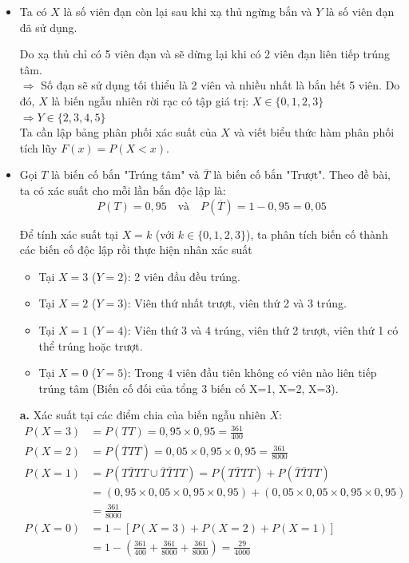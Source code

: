 \documentclass[12pt]{article}
\begin{document}
\begin{itemize}
    \item Ta có $X$ là số viên đạn còn lại sau khi xạ thủ ngừng bắn và $Y$ là số viên đạn đã sử dụng.
    
    Do xạ thủ chỉ có 5 viên đạn và sẽ dừng lại khi có 2 viên đạn liên tiếp trúng tâm.\\
    $\Rightarrow$ Số đạn sẽ sử dụng tối thiểu là 2 viên và nhiều nhất là bắn hết 5 viên. Do đó, $X$ là biến ngẫu nhiên rời rạc có tập giá trị: $X \in \{0, 1, 2, 3\}$ $\Rightarrow Y \in \{2, 3, 4, 5\}$ \\

    Ta cần lập bảng phân phối xác suất của $X$ và viết biểu thức hàm phân phối tích lũy $F(x) = P(X < x)$.

    \item Gọi $T$ là biến cố bắn "Trúng tâm" và $\overline{T}$ là biến cố bắn "Trượt". Theo đề bài, ta có xác suất cho mỗi lần bắn độc lập là:
    \[ P(T) = 0,95 \quad \text{và} \quad P(\overline{T}) = 1 - 0,95 = 0,05 \]
    
    Để tính xác suất tại $X = k$ (với $k \in \{0, 1, 2, 3\}$), ta phân tích biến cố thành các biến cố độc lập rồi thực hiện nhân xác suất
    \begin{itemize}
        \item Tại $X=3$ ($Y=2$): 2 viên đầu đều trúng.
        \item Tại $X=2$ ($Y=3$): Viên thứ nhất trượt, viên thứ 2 và 3 trúng.
        \item Tại $X=1$ ($Y=4$): Viên thứ 3 và 4 trúng, viên thứ 2 trượt, viên thứ 1 có thể trúng hoặc trượt.
        \item Tại $X=0$ ($Y=5$): Trong 4 viên đầu tiên không có viên nào liên tiếp trúng tâm (Biến cố đối của tổng 3 biến cố X=1, X=2, X=3).
    \end{itemize}

\textbf{a.} Xác suất tại các điểm chia của biến ngẫu nhiên $X$:
    \begin{align*}
        P(X=3) &= P(TT) = 0,95 \times 0,95 = \frac{361}{400} \\
        P(X=2) &= P(\overline{T}TT) = 0,05 \times 0,95 \times 0,95 = \frac{361}{8000} \\
        P(X=1) &= P(T\overline{T}TT \cup \overline{T}\overline{T}TT) = P(T\overline{T}TT) + P(\overline{T}\overline{T}TT) \\
        &=(0,95 \times 0,05 \times 0,95 \times 0,95) + (0,05 \times 0,05 \times 0,95 \times 0,95)\\
        &=\frac{361}{8000} \\
        P(X=0) &= 1 - [P(X=3) + P(X=2) + P(X=1)]\\
        &= 1- (\frac{361}{400} + \frac{361}{8000} + \frac{361}{8000}) = \frac{29}{4000}
    \end{align*}


\end{itemize}
\end{document}
